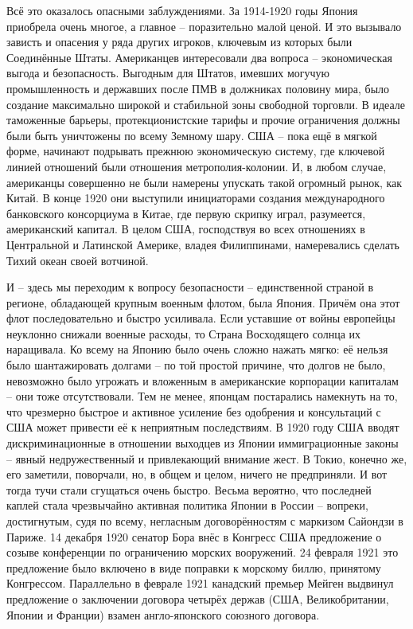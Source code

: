 Всё это оказалось опасными заблуждениями. За 1914-1920 годы Япония приобрела очень многое, а главное – поразительно малой ценой. И это вызывало зависть и опасения у ряда других игроков, ключевым из которых были Соединённые Штаты. Американцев интересовали два вопроса – экономическая выгода и безопасность. Выгодным для Штатов, имевших могучую промышленность и державших после ПМВ в должниках половину мира, было создание максимально широкой и стабильной зоны свободной торговли. В идеале таможенные барьеры, протекционистские тарифы и прочие ограничения должны были быть уничтожены по всему Земному шару. США – пока ещё в мягкой форме, начинают подрывать прежнюю экономическую систему, где ключевой линией отношений были отношения метрополия-колонии. И, в любом случае, американцы совершенно не были намерены упускать такой огромный рынок, как Китай. В конце 1920 они выступили инициаторами создания международного банковского консорциума в Китае, где первую скрипку играл, разумеется, американский капитал. В целом США, господствуя во всех отношениях в Центральной и Латинской Америке, владея Филиппинами, намеревались сделать Тихий океан своей вотчиной.

И – здесь мы переходим к вопросу безопасности – единственной страной в регионе, обладающей крупным военным флотом, была Япония. Причём она этот флот последовательно и быстро усиливала. Если уставшие от войны европейцы неуклонно снижали военные расходы, то Страна Восходящего солнца их наращивала. Ко всему на Японию было очень сложно нажать мягко: её нельзя было шантажировать долгами – по той простой причине, что долгов не было, невозможно было угрожать и вложенным в американские корпорации капиталам – они тоже отсутствовали. Тем не менее, японцам постарались намекнуть на то, что чрезмерно быстрое и активное усиление без одобрения и консультаций с США может привести её к неприятным последствиям. В 1920 году США вводят дискриминационные в отношении выходцев из Японии иммиграционные законы – явный недружественный и привлекающий внимание жест. В Токио, конечно же, его заметили, поворчали, но, в общем и целом, ничего не предприняли. И вот тогда тучи стали сгущаться очень быстро. Весьма вероятно, что последней каплей стала чрезвычайно активная политика Японии в России – вопреки, достигнутым, судя по всему, негласным договорённостям с маркизом Сайондзи в Париже. 14 декабря 1920 сенатор Бора внёс в Конгресс США предложение о созыве конференции по ограничению морских вооружений. 24 февраля 1921 это предложение было включено в виде поправки к морскому биллю, принятому Конгрессом. Параллельно в феврале 1921 канадский премьер Мейген выдвинул предложение о заключении договора четырёх держав (США, Великобритании, Японии и Франции) взамен англо-японского союзного договора. 

